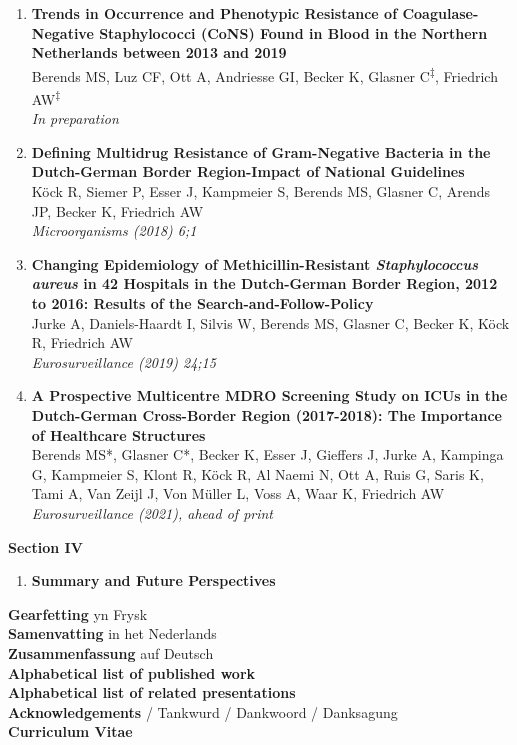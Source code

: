 \documentclass[
]{book}
\providecommand{\tightlist}{%
  \setlength{\itemsep}{0pt}\setlength{\parskip}{0pt}}
\begin{document}
\begin{enumerate}
\def\labelenumi{\arabic{enumi}.}
\setcounter{enumi}{6}
\item
  \textbf{Trends in Occurrence and Phenotypic Resistance of Coagulase-Negative Staphylococci (CoNS) Found in Blood in the Northern Netherlands between 2013 and 2019}\\
  Berends MS, Luz CF, Ott A, Andriesse GI, Becker K, Glasner C\textsuperscript{‡}, Friedrich AW\textsuperscript{‡}\\
  \emph{In preparation}
\item
  \textbf{Defining Multidrug Resistance of Gram-Negative Bacteria in the Dutch-German Border Region-Impact of National Guidelines}\\
  Köck R, Siemer P, Esser J, Kampmeier S, Berends MS, Glasner C, Arends JP, Becker K, Friedrich AW\\
  \emph{Microorganisms (2018) 6;1}
\item
  \textbf{Changing Epidemiology of Methicillin-Resistant \emph{Staphylococcus aureus} in 42 Hospitals in the Dutch-German Border Region, 2012 to 2016: Results of the Search-and-Follow-Policy}\\
  Jurke A, Daniels-Haardt I, Silvis W, Berends MS, Glasner C, Becker K, Köck R, Friedrich AW\\
  \emph{Eurosurveillance (2019) 24;15}
\item
  \textbf{A Prospective Multicentre MDRO Screening Study on ICUs in the Dutch-German Cross-Border Region (2017-2018): The Importance of Healthcare Structures}\\
  Berends MS*, Glasner C*, Becker K, Esser J, Gieffers J, Jurke A, Kampinga G, Kampmeier S, Klont R, Köck R, Al Naemi N, Ott A, Ruis G, Saris K, Tami A, Van Zeijl J, Von Müller L, Voss A, Waar K, Friedrich AW\\
  \emph{Eurosurveillance (2021), ahead of print}
\end{enumerate}

\textbf{Section IV}

\begin{enumerate}
\def\labelenumi{\arabic{enumi}.}
\setcounter{enumi}{10}
\tightlist
\item
  \textbf{Summary and Future Perspectives}
\end{enumerate}

\textbf{Gearfetting} yn Frysk\\
\textbf{Samenvatting} in het Nederlands\\
\textbf{Zusammenfassung} auf Deutsch\\
\textbf{Alphabetical list of published work}\\
\textbf{Alphabetical list of related presentations}\\
\textbf{Acknowledgements} / Tankwurd / Dankwoord / Danksagung\\
\textbf{Curriculum Vitae}
\end{document}
